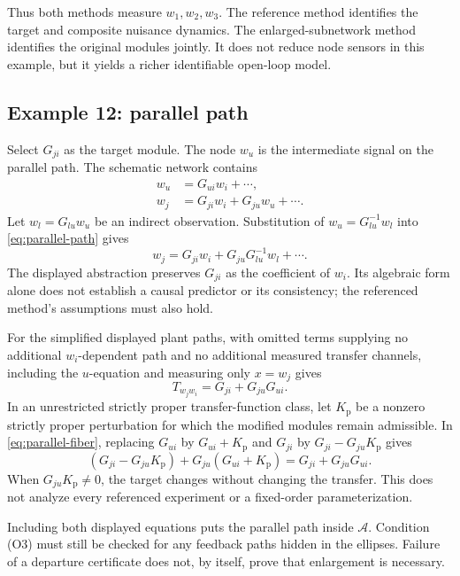 \documentclass[11pt,a4paper]{article}
\newcommand{\Aset}{\mathcal A}
\begin{document}
Thus both methods measure $w_1,w_2,w_3$.  The reference method identifies the target and composite nuisance dynamics.  The enlarged-subnetwork method identifies the original modules jointly.  It does not reduce node sensors in this example, but it yields a richer identifiable open-loop model.

\subsection{Example 12: parallel path}

Select $G_{ji}$ as the target module.  The node $w_u$ is the intermediate signal on the parallel path.  The schematic network contains
\begin{align}
  w_u&=G_{ui}w_i+\cdots,\\
  w_j&=G_{ji}w_i+G_{ju}w_u+\cdots.
  \label{eq:parallel-path}
\end{align}
Let $w_l=G_{lu}w_u$ be an indirect observation.  Substitution of $w_u=G_{lu}^{-1}w_l$ into \eqref{eq:parallel-path} gives
\begin{equation}
  w_j=G_{ji}w_i+G_{ju}G_{lu}^{-1}w_l+\cdots.
  \label{eq:parallel-abstraction}
\end{equation}
The displayed abstraction preserves $G_{ji}$ as the coefficient of $w_i$.  Its algebraic form alone does not establish a causal predictor or its consistency; the referenced method's assumptions must also hold.

For the simplified displayed plant paths, with omitted terms supplying no additional $w_i$-dependent path and no additional measured transfer channels, including the $u$-equation and measuring only $x=w_j$ gives
\begin{equation}
  T_{w_jw_i}=G_{ji}+G_{ju}G_{ui}.
  \label{eq:parallel-fiber}
\end{equation}
In an unrestricted strictly proper transfer-function class, let $K_{\mathrm p}$ be a nonzero strictly proper perturbation for which the modified modules remain admissible.  In \eqref{eq:parallel-fiber}, replacing $G_{ui}$ by $G_{ui}+K_{\mathrm p}$ and $G_{ji}$ by $G_{ji}-G_{ju}K_{\mathrm p}$ gives
\[
  (G_{ji}-G_{ju}K_{\mathrm p})+G_{ju}(G_{ui}+K_{\mathrm p})
  =G_{ji}+G_{ju}G_{ui}.
\]
When $G_{ju}K_{\mathrm p}\ne0$, the target changes without changing the transfer.  This does not analyze every referenced experiment or a fixed-order parameterization.

Including both displayed equations puts the parallel path inside $\Aset$.  Condition (O3) must still be checked for any feedback paths hidden in the ellipses.  Failure of a departure certificate does not, by itself, prove that enlargement is necessary.
\end{document}
